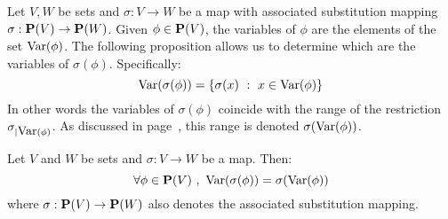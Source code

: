 Let $V,W$ be sets and $\sigma:V\to W$ be a map with associated
substitution mapping $\sigma:\mbox{${\bf P}(V)$}\to{\bf P}(W)$. Given $\phi\in\mbox{${\bf P}(V)$}$,
the variables of $\phi$ are the elements of the set $\mbox{\rm Var}(\phi)$.
The following proposition allows us to determine which are the
variables of $\sigma(\phi)$. Specifically:
    \[
    \var(\sigma(\phi))=\{\sigma(x)\ :\ x\in\var(\phi)\}
    \]
In other words the variables of $\sigma(\phi)$ coincide with the
range of the restriction $\sigma_{|\mbox{\rm Var}(\phi)}$. As discussed in
page~\pageref{logic:lemma:pullback}, this range is denoted
$\sigma(\mbox{\rm Var}(\phi))$.
\begin{prop}\label{logic:prop:var:of:substitution}
Let $V$ and $W$ be sets and $\sigma:V\to W$ be a map. Then:
    \[
    \forall\phi\in\pv\ ,\ \var(\sigma(\phi))=\sigma(\var(\phi))
    \]
where $\sigma:\mbox{${\bf P}(V)$}\to{\bf P}(W)$ also denotes the associated substitution mapping.
\end{prop}
